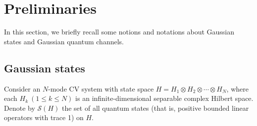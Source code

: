 \documentclass[10pt,aps,pra,amsfonts,amssymb,amsmath,%
floatfix,nofootinbib, groupedaddress,superscriptaddress,citesort,twocolumn
]{revtex4}%
\begin{document}
\section{Preliminaries}

In this section, we  briefly recall some notions and notations about  Gaussian states and  Gaussian quantum channels.


\subsection{ Gaussian states }

 Consider an $N$-mode CV system with state space $H=H_1\otimes H_2\otimes \cdots\otimes H_N$, where each $H_k \ (1\le k\le N)$ is an infinite-dimensional separable complex Hilbert space.
 Denote by $\mathcal{S}(H)$ the set of all quantum states (that is, positive bounded linear operators with trace 1) on $H$.
\end{document}
